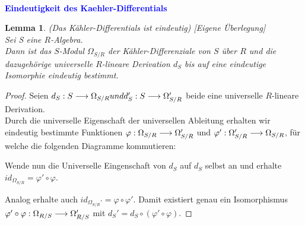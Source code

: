 \documentclass[10pt,a4paper]{report}
\newcounter{Aussage}[chapter]
\newtheorem{lemma}[Aussage]{Lemma}
\newcommand{\functionfront}[3]{\nolinebreak{#1:#2 \longrightarrow #3}}
\newcommand{\divR}[2]{\Omega_{#1/#2}}
\newcommand{\divf}[1]{d_{#1}}
\begin{document}
\ \\
\textcolor{blue}{\textbf{Eindeutigkeit des Kaehler-Differentials}}
\begin{lemma}\label{Eindeutigkeit des Kaehler-Differentials}(Das Kähler-Differentials ist eindeutig) \textit{[Eigene Überlegung]}\\
Sei S eine $R$-Algebra.\\
Dann ist das $S$-Modul $\divR{S}{R}$ der Kähler-Differenziale von $S$ über $R$ und die dazugehörige universelle $R$-lineare Derivation $\divf{S}$ bis auf eine eindeutige Isomorphie eindeutig bestimmt.
\end{lemma}
\begin{proof}
Seien $\functionfront{\divf{S}}{S}{\divR{S}{R}} und \functionfront{\divf{S}'}{S}{\divR{S}{R}'}$ beide eine universelle $R$-lineare Derivation.\\
Durch die universelle Eigenschaft der universellen Ableitung erhalten wir eindeutig bestimmte Funktionen
$\functionfront{\varphi}{\divR{S}{R}}{\divR{S}{R}'}$ und $\functionfront{\varphi'}{\divR{S}{R}'}{\divR{S}{R}}$, für welche die folgenden Diagramme kommutieren:
\begin{center}
\end{center}
Wende nun die Universelle Eingenschaft von $\divf{S}$ auf $\divf{S}$ selbst an und erhalte $id_{\divR{S}{R}} = \varphi' \circ \varphi$. 
\begin{center}
\end{center}
Analog erhalte auch $id_{\divR{S}{R}'} = \varphi \circ \varphi'$. Damit existiert genau ein Isomorphismus $\functionfront{\varphi' \circ \varphi}{\divR{R}{S}}{\divR{R}{S}'}$ mit $\divf{S}' = \divf{S} \circ (\varphi' \circ \varphi)$.
\end{proof}
\end{document}
